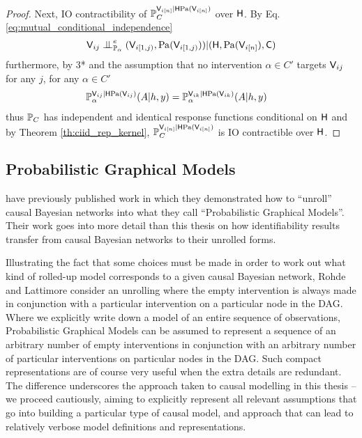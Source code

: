 \begin{proof}
Next, IO contractibility of $\mathbb{P}_C^{\mathsf{V}_{i[n]}|\mathsf{H}\mathrm{Pa}(\mathsf{V}_{i [n]})}$ over $\mathsf{H}$. By Eq. \eqref{eq:mutual_conditional_independence}
\begin{align}
    \RV{V}_{ij}\CI^e_{\prob{P}_{\alpha}} (\RV{V}_{i [1,j)},\mathrm{Pa}(\RV{V}_{i [1,j)}) )|(\RV{H},\mathrm{Pa}(\RV{V}_{i[n]}),\RV{C})
\end{align}
furthermore, by 3* and the assumption that no intervention $\alpha\in C'$ targets $\mathsf{V}_{ij}$ for any $j$, for any $\alpha\in C'$
\begin{align}
    \mathbb{P}_{\alpha}^{\mathsf{V}_{ij}|\mathsf{H}\mathrm{Pa}(\mathsf{V}_{ij})}(A|h,y) &= \mathbb{P}_{\alpha}^{\mathsf{V}_{ik}|\mathsf{H}\mathrm{Pa}(\mathsf{V}_{ik})}(A|h,y) 
\end{align}
thus $\mathbb{P}_C$ has independent and identical response functions conditional on $\mathsf{H}$ and by Theorem \ref{th:ciid_rep_kernel}, $\mathbb{P}_C^{\mathsf{V}_{i[n]}|\mathsf{H}\mathrm{Pa}(\mathsf{V}_{i [n]})}$ is IO contractible over $\mathsf{H}$.
\end{proof}

\subsection[Probabilistic Graphical Models]{Probabilistic Graphical Models}

\citet{lattimore_replacing_2019,lattimore_causal_2019} have previously published work in which they demonstrated how to ``unroll'' causal Bayesian networks into what they call ``Probabilistic Graphical Models''. Their work goes into more detail than this thesis on how identifiability results transfer from causal Bayesian networks to their unrolled forms.

Illustrating the fact that some choices must be made in order to work out what kind of rolled-up model corresponds to a given causal Bayesian network, Rohde and Lattimore consider an unrolling where the empty intervention is always made in conjunction with a particular intervention on a particular node in the DAG. Where we explicitly write down a model of an entire sequence of observations, Probabilistic Graphical Models can be assumed to represent a sequence of an arbitrary number of empty interventions in conjunction with an arbitrary number of particular interventions on particular nodes in the DAG. Such compact representations are of course very useful when the extra details are redundant. The difference underscores the approach taken to causal modelling in this thesis -- we proceed cautiously, aiming to explicitly represent all relevant assumptions that go into building a particular type of causal model, and approach that can lead to relatively verbose model definitions and representations.

